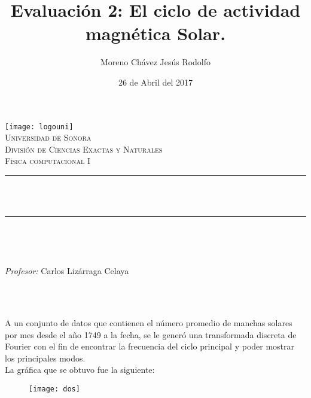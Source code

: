 \documentclass[12pt]{article}
\title{Evaluación 2: El ciclo de actividad magnética Solar.}		%
\author{\centering Moreno Chávez Jesús Rodolfo}											%
\date{26 de Abril del 2017} %
\makeatletter
\let\thetitle\@title
\let\theauthor\@author
\let\thedate\@date
\makeatother
\begin{document}

\begin{titlepage}
	\centering
    \vspace*{0.5 cm}
    \texttt{[image: logouni]}\\[0.5 cm]	%
    \textsc{\Large Universidad de Sonora}\\[1.0 cm]	%
	\textsc{\Large División de Ciencias Exactas y Naturales}\\[0.5 cm]				%
	\textsc{\large Física computacional I}\\[0.5 cm]				%
	\rule{\linewidth}{0.2 mm} \\[0.4 cm]
	{ \huge \bfseries \thetitle}\\
	\rule{\linewidth}{0.2 mm} \\[0.5 cm]
	
	\begin{minipage}{\textwidth}
		\begin{flushleft} 
			\emph{\Large} \large \\
			\theauthor
			\end{flushleft}
	
		\begin{flushleft} 
			\emph{\Large Profesor:} \large \centering Carlos Lizárraga Celaya 	
			\end{flushleft}
	\end{minipage}\\[1 cm]
	{\large \thedate}\\[2 cm]
 
	\vfill
	
\end{titlepage}



A un conjunto de datos que contienen el número promedio de manchas solares por mes desde el año 1749 a la fecha, se  le generó una  transformada discreta de Fourier con el fin de encontrar la frecuencia del ciclo principal y poder mostrar los principales modos.\\ 
La gráfica que se obtuvo fue la siguiente:

\begin{figure}[ht]
\texttt{[image: dos]}
\centering
\end{figure}
\end{document}
